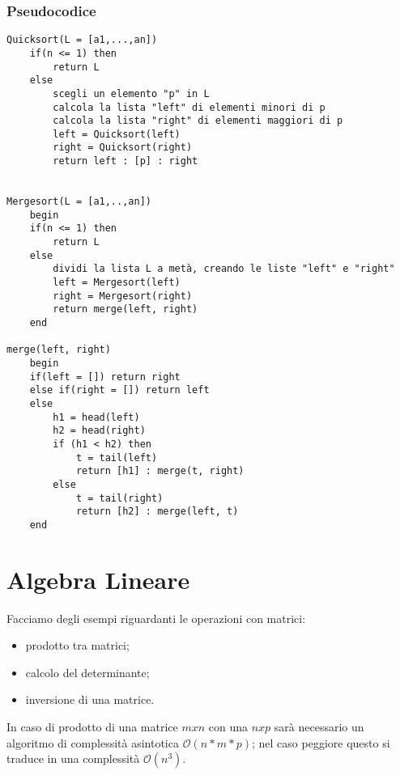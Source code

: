 \subsubsection{Pseudocodice}
\begin{verbatim}
Quicksort(L = [a1,...,an])
    if(n <= 1) then
        return L
    else
        scegli un elemento "p" in L
	    calcola la lista "left" di elementi minori di p
	    calcola la lista "right" di elementi maggiori di p
	    left = Quicksort(left)
	    right = Quicksort(right)
	    return left : [p] : right


Mergesort(L = [a1,..,an])
    begin
    if(n <= 1) then
        return L
    else
        dividi la lista L a metà, creando le liste "left" e "right" 
        left = Mergesort(left)
        right = Mergesort(right)
        return merge(left, right)
    end
        
merge(left, right)
    begin
    if(left = []) return right
    else if(right = []) return left
    else
        h1 = head(left)
        h2 = head(right)
        if (h1 < h2) then
            t = tail(left)
            return [h1] : merge(t, right)
        else
            t = tail(right)
            return [h2] : merge(left, t)
    end
\end{verbatim}
\section{Algebra Lineare}
Facciamo degli esempi riguardanti le operazioni con matrici:
\begin{itemize}
\item{prodotto tra matrici;}
\item{calcolo del determinante;}
\item{inversione di una matrice.}
\end{itemize}
In caso di prodotto di una matrice $mxn$ con una $nxp$ sarà necessario un algoritmo di complessità asintotica  $\mathcal {O}(n*m*p)$; nel caso peggiore questo si traduce in una complessità $\mathcal {O}(n^3)$.


